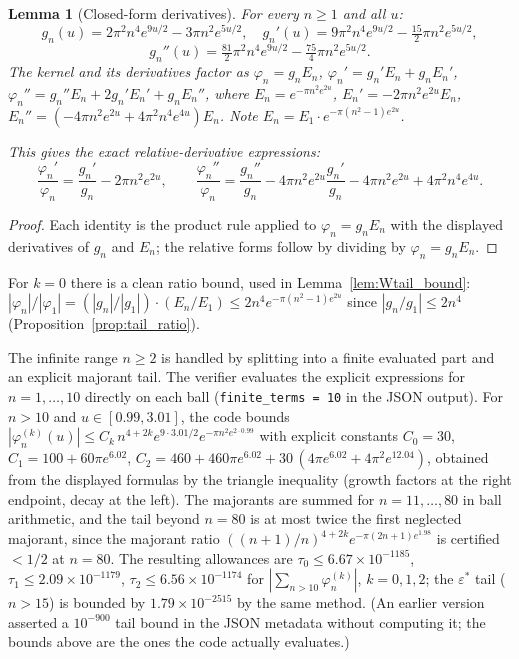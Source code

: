 \documentclass[11pt]{article}
\newtheorem{lemma}[theorem]{Lemma}
\theoremstyle{definition}
\theoremstyle{remark}
\begin{document}
\begin{lemma}[Closed-form derivatives]\label{lem:derivbounds}
For every $n \geq 1$ and all $u$:
\[
g_n(u) = 2\pi^2 n^4 e^{9u/2} - 3\pi n^2 e^{5u/2}, \quad
g_n'(u) = 9\pi^2 n^4 e^{9u/2} - \tfrac{15}{2}\pi n^2 e^{5u/2},
\]
\[
g_n''(u) = \tfrac{81}{2}\pi^2 n^4 e^{9u/2} - \tfrac{75}{4}\pi n^2 e^{5u/2}.
\]
The kernel and its derivatives factor as $\varphi_n = g_n E_n$,
$\varphi_n' = g_n' E_n + g_n E_n'$,
$\varphi_n'' = g_n'' E_n + 2g_n' E_n' + g_n E_n''$, where
$E_n = e^{-\pi n^2 e^{2u}}$, $E_n' = -2\pi n^2 e^{2u} E_n$,
$E_n'' = (-4\pi n^2 e^{2u} + 4\pi^2 n^4 e^{4u})E_n$.
Note $E_n = E_1 \cdot e^{-\pi(n^2-1)e^{2u}}$.

This gives the exact relative-derivative expressions:
\[
\frac{\varphi_n'}{\varphi_n} = \frac{g_n'}{g_n} - 2\pi n^2 e^{2u}, \qquad
\frac{\varphi_n''}{\varphi_n} = \frac{g_n''}{g_n}
  - 4\pi n^2 e^{2u}\frac{g_n'}{g_n} - 4\pi n^2 e^{2u} + 4\pi^2 n^4 e^{4u}.
\]
\end{lemma}

\begin{proof}
Each identity is the product rule applied to $\varphi_n = g_n E_n$
with the displayed derivatives of $g_n$ and $E_n$; the relative forms
follow by dividing by $\varphi_n = g_n E_n$.
\end{proof}

For $k=0$ there is a clean ratio bound, used in
Lemma~\ref{lem:Wtail_bound}: $|\varphi_n|/|\varphi_1|
= (|g_n|/|g_1|)\cdot(E_n/E_1)
\leq 2n^4 e^{-\pi(n^2-1)e^{2u}}$ since $|g_n/g_1| \leq 2n^4$
(Proposition~\ref{prop:tail_ratio}).

The infinite range $n\geq 2$ is handled by splitting into a finite
evaluated part and an explicit majorant tail.
The verifier evaluates the explicit expressions for $n=1,\ldots,10$
directly on each ball (\texttt{finite\_terms = 10} in the JSON output).
For $n > 10$ and $u \in [0.99, 3.01]$, the code bounds
$|\varphi_n^{(k)}(u)| \leq C_k\, n^{4+2k} e^{9\cdot 3.01/2}
e^{-\pi n^2 e^{2\cdot 0.99}}$ with explicit constants
$C_0 = 30$, $C_1 = 100 + 60\pi e^{6.02}$,
$C_2 = 460 + 460\pi e^{6.02} + 30\,(4\pi e^{6.02} + 4\pi^2 e^{12.04})$,
obtained from the displayed formulas by the triangle inequality
(growth factors at the right endpoint, decay at the left).
The majorants are summed for $n = 11,\ldots,80$ in ball arithmetic,
and the tail beyond $n = 80$ is at most twice the first neglected
majorant, since the majorant ratio
$((n{+}1)/n)^{4+2k} e^{-\pi(2n+1)e^{1.98}}$ is certified $< 1/2$ at
$n = 80$.
The resulting allowances are
$\tau_0 \leq 6.67\times 10^{-1185}$,
$\tau_1 \leq 2.09\times 10^{-1179}$,
$\tau_2 \leq 6.56\times 10^{-1174}$
for $|\sum_{n>10}\varphi_n^{(k)}|$, $k = 0,1,2$;
the $\varepsilon^*$ tail ($n > 15$) is bounded by
$1.79\times 10^{-2515}$ by the same method.
(An earlier version asserted a $10^{-900}$ tail bound in the JSON
metadata without computing it; the bounds above are the ones the code
actually evaluates.)
\end{document}
